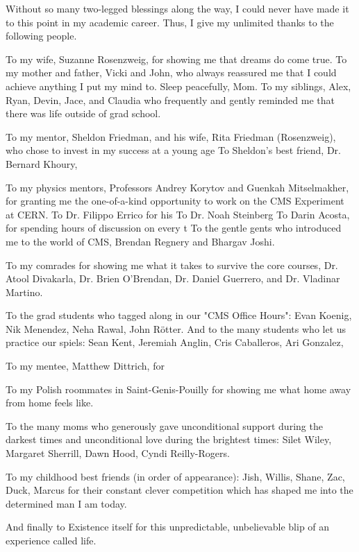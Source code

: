 Without so many two-legged blessings along the way, I could never have made it to this point in my academic career.
Thus, I give my unlimited thanks to the following people.

To my wife, Suzanne Rosenzweig, for showing me that dreams do come true.
To my mother and father, Vicki and John, who always reassured me that I could achieve anything I put my mind to. Sleep peacefully, Mom.
To my siblings, Alex, Ryan, Devin, Jace, and Claudia who frequently and gently reminded me that there was life outside of grad school.

To my mentor, Sheldon Friedman, and his wife, Rita Friedman (Rosenzweig), who chose to invest in my success at a young age
To Sheldon's best friend, Dr. Bernard Khoury, 

To my physics mentors, Professors Andrey Korytov and Guenkah Mitselmakher, for granting me the one-of-a-kind opportunity to work on the CMS Experiment at CERN.
To Dr. Filippo Errico for his 
To Dr. Noah Steinberg
To Darin Acosta, for spending hours of discussion on every t
To the gentle gents who introduced me to the world of CMS, Brendan Regnery and Bhargav Joshi.

To my comrades for showing me what it takes to survive the core courses,
Dr. Atool Divakarla, Dr. Brien O'Brendan, Dr. Daniel Guerrero, and Dr. Vladinar Martino.

To the grad students who tagged along in our "CMS Office Hours":
Evan Koenig, Nik Menendez, Neha Rawal, John Rötter.
And to the many students who let us practice our spiels:
Sean Kent, Jeremiah Anglin, Cris Caballeros, Ari Gonzalez, 

To my mentee, Matthew Dittrich, for 

To my Polish roommates in Saint-Genis-Pouilly for showing me what home away from home feels like.

To the many moms who generously gave unconditional support during the darkest times and unconditional love during the brightest times:
Silet Wiley, Margaret Sherrill, Dawn Hood, Cyndi Reilly-Rogers.

To my childhood best friends (in order of appearance):
Jish, Willis, Shane, Zac, Duck, Marcus for their constant clever competition which has shaped me into the determined man I am today.

And finally to Existence itself for this unpredictable, unbelievable blip of an experience called life.
